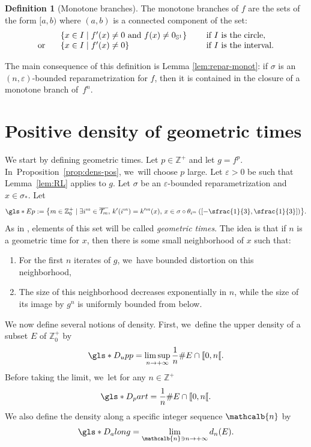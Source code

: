 \documentclass[JEP,XML,SOM,Unicode,NoFloatCountersInSection,published]{cedram}
\newenvironment{enumeratei}
{\bgroup\def\theenumi{\roman{enumi}}\def\theenumii{\arabic{enumii}}\begin{enumerate}}
{\end{enumerate}\egroup}
\newcommand{\mcbn}{{\mathcalb{n}}}
\theoremstyle{definition}
\newtheorem{definition}[thm]{Definition}
\newcommand{\bbS}{{\mathbb{S}}}
\newcommand{\bbZ}{{\mathbb{Z}}}
\begin{document}
\begin{definition}[Monotone branches]
\label{def:monot-branche}
The monotone branches of $f$ are the sets of the form $[a,b)$ where $(a,b)$ is a connected component of the set:
\[
\begin{array}{l l l}
&\{ x \in I \mid f'(x) \neq 0 \text{ and } f(x) \neq 0_{\bbS^1} \} \quad &\text{ if } I \text{ is the circle},\\
\text{or}\;\;\;
&\{ x \in I \mid f'(x) \neq 0 \} &\text{ if } I \text{ is the interval}.
\end{array}
\]
\end{definition}

The main consequence of this definition is Lemma \ref{lem:repar-monot}: if $\sigma$ is an $(n, \varepsilon)$-bounded reparametrization for $f$, then it is contained in the closure of a monotone branch of~$f^n$.

\section{Positive density of geometric times}
\label{sec:dens-geom}

We start by defining geometric times.
Let $p \in \bbZ^+$ and let $g = f^p$. In~Proposition~\ref{prop:dens-pos}, we~will choose $p$ large.
Let $\varepsilon > 0$ be such that Lemma~\ref{lem:RL} applies to $g$. Let $\sigma$ be an $\varepsilon$-bounded reparametrization and $x \in \sigma_*$.
Let
\[
\gls*{Ep} := \bigl \{ m \in \bbZ_0^+ \mid \exists i^m \in \overline{\mathcal{T}_m},\, k'(i^m) = k'^m(x),\, x \in \sigma \circ \theta_{i^m} \left (\left [ - \sfrac{1}{3}, \sfrac{1}{3} \right ] \right) \bigr \}.
\]
As in \cite{MR4701884}, elements of this set will be called \textit{geometric times}.
The idea is that if $n$ is a geometric time for $x$, then there is some small neighborhood of $x$ such that:
\begin{enumeratei}
\item
For the first $n$ iterates of $g$, we~have bounded distortion on this neighborhood,
\item
The size of this neighborhood decreases exponentially in $n$, while the size of its image by $g^n$ is uniformly bounded from below.
\end{enumeratei}

We now define several notions of density. First, we~define the upper density of a subset $E$ of $\bbZ_0^+$ by
\[
\gls*{D_upp} = \limsup_{n \to +\infty} \frac{1}{n} \# E \cap [\![ 0, n [\![.
\]
Before taking the limit, we~let for any $n \in \mathbb{Z^+}$
\[
\gls*{D_part} = \frac{1}{n} \# E \cap [\![ 0, n [\![.
\]
We also define the density along a specific integer sequence $\mcbn$ by
\[
\gls*{D_along} = \lim_{\mcbn \ni n \to +\infty} d_n(E).
\]
\end{document}
